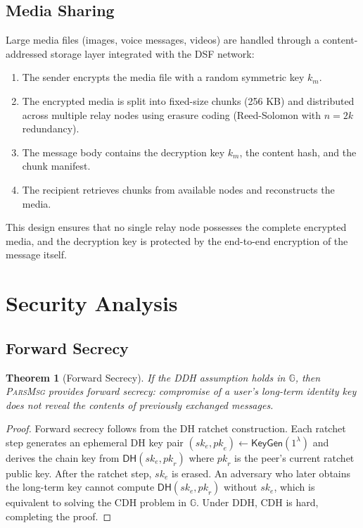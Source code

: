 \documentclass[11pt,a4paper]{article}
\newcommand{\protname}{\textsc{ParsMsg}\xspace}
\newcommand{\secparam}{\lambda}
\newcommand{\GG}{\mathbb{G}}
\newtheorem{theorem}{Theorem}
\begin{document}
\subsection{Media Sharing}

Large media files (images, voice messages, videos) are handled through a content-addressed storage layer integrated with the DSF network:

\begin{enumerate}
    \item The sender encrypts the media file with a random symmetric key $k_m$.
    \item The encrypted media is split into fixed-size chunks (256 KB) and distributed across multiple relay nodes using erasure coding (Reed-Solomon with $n = 2k$ redundancy).
    \item The message body contains the decryption key $k_m$, the content hash, and the chunk manifest.
    \item The recipient retrieves chunks from available nodes and reconstructs the media.
\end{enumerate}

This design ensures that no single relay node possesses the complete encrypted media, and the decryption key is protected by the end-to-end encryption of the message itself.

\section{Security Analysis}

\subsection{Forward Secrecy}

\begin{theorem}[Forward Secrecy]
\label{thm:forward-secrecy}
If the DDH assumption holds in $\GG$, then \protname provides forward secrecy: compromise of a user's long-term identity key does not reveal the contents of previously exchanged messages.
\end{theorem}

\begin{proof}
Forward secrecy follows from the DH ratchet construction. Each ratchet step generates an ephemeral DH key pair $(\mathit{sk}_e, \mathit{pk}_e) \leftarrow \mathsf{KeyGen}(1^\secparam)$ and derives the chain key from $\mathsf{DH}(\mathit{sk}_e, \mathit{pk}_r)$ where $\mathit{pk}_r$ is the peer's current ratchet public key. After the ratchet step, $\mathit{sk}_e$ is erased. An adversary who later obtains the long-term key cannot compute $\mathsf{DH}(\mathit{sk}_e, \mathit{pk}_r)$ without $\mathit{sk}_e$, which is equivalent to solving the CDH problem in $\GG$. Under DDH, CDH is hard, completing the proof.
\end{proof}
\end{document}
